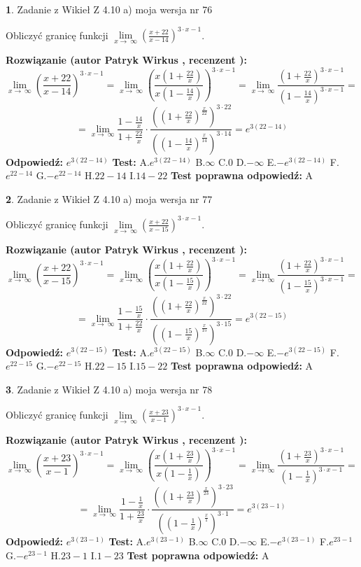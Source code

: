 \documentclass[12pt, a4paper]{article}
\theoremstyle{definition} %
\newtheorem{zad}{}
\newcommand{\zadStart}[1]{\begin{zad}#1\newline}
\newcommand{\zadStop}{\end{zad}}
\newcommand{\rozwStart}[2]{\noindent \textbf{Rozwiązanie (autor #1 , recenzent #2): }\newline}
\newcommand{\rozwStop}{\newline}
\newcommand{\odpStart}{\noindent \textbf{Odpowiedź:}\newline}
\newcommand{\odpStop}{\newline}
\newcommand{\testStart}{\noindent \textbf{Test:}\newline}
\newcommand{\testStop}{\newline}
\newcommand{\kluczStart}{\noindent \textbf{Test poprawna odpowiedź:}\newline}
\newcommand{\kluczStop}{\newline}
\begin{document}
\zadStart{Zadanie z Wikieł Z 4.10 a) moja wersja nr 76}


Obliczyć granicę funkcji  $\lim\limits_{x\to\ \infty}(\frac{x+22}{x-14})^{3\cdot x-1}$.
\zadStop
\rozwStart{Patryk Wirkus}{}
$$\lim\limits_{x\to\ \infty}(\frac{x+22}{x-14})^{3\cdot x-1} = \lim\limits_{x\to\ \infty}(\frac{x(1+\frac{22}{x})}{x(1-\frac{14}{x})})^{3\cdot x-1}=\lim\limits_{x\to\ \infty}\frac{(1+\frac{22}{x})^{3\cdot x-1}}{(1-\frac{14}{x})^{3\cdot x-1}}=$$
$$=\lim\limits_{x\to\ \infty}\frac{1-\frac{14}{x}}{1+\frac{22}{x}}\cdot\frac{((1+\frac{22}{x})^{\frac{x}{22}})^{3\cdot22}}{((1-\frac{14}{x})^{\frac{x}{14}})^{3\cdot14}}=e^{3(22-14)}$$
\rozwStop
\odpStart
$e^{3(22-14)}$
\odpStop
\testStart
A.$e^{3(22-14)}$ B.$\infty$ C.$0$ D.$-\infty$ E.$-e^{3(22-14)}$
F.$e^{22-14}$ G.$-e^{22-14}$
H.$22-14$
I.$14-22$
\testStop
\kluczStart
A
\kluczStop



\zadStart{Zadanie z Wikieł Z 4.10 a) moja wersja nr 77}


Obliczyć granicę funkcji  $\lim\limits_{x\to\ \infty}(\frac{x+22}{x-15})^{3\cdot x-1}$.
\zadStop
\rozwStart{Patryk Wirkus}{}
$$\lim\limits_{x\to\ \infty}(\frac{x+22}{x-15})^{3\cdot x-1} = \lim\limits_{x\to\ \infty}(\frac{x(1+\frac{22}{x})}{x(1-\frac{15}{x})})^{3\cdot x-1}=\lim\limits_{x\to\ \infty}\frac{(1+\frac{22}{x})^{3\cdot x-1}}{(1-\frac{15}{x})^{3\cdot x-1}}=$$
$$=\lim\limits_{x\to\ \infty}\frac{1-\frac{15}{x}}{1+\frac{22}{x}}\cdot\frac{((1+\frac{22}{x})^{\frac{x}{22}})^{3\cdot22}}{((1-\frac{15}{x})^{\frac{x}{15}})^{3\cdot15}}=e^{3(22-15)}$$
\rozwStop
\odpStart
$e^{3(22-15)}$
\odpStop
\testStart
A.$e^{3(22-15)}$ B.$\infty$ C.$0$ D.$-\infty$ E.$-e^{3(22-15)}$
F.$e^{22-15}$ G.$-e^{22-15}$
H.$22-15$
I.$15-22$
\testStop
\kluczStart
A
\kluczStop



\zadStart{Zadanie z Wikieł Z 4.10 a) moja wersja nr 78}


Obliczyć granicę funkcji  $\lim\limits_{x\to\ \infty}(\frac{x+23}{x-1})^{3\cdot x-1}$.
\zadStop
\rozwStart{Patryk Wirkus}{}
$$\lim\limits_{x\to\ \infty}(\frac{x+23}{x-1})^{3\cdot x-1} = \lim\limits_{x\to\ \infty}(\frac{x(1+\frac{23}{x})}{x(1-\frac{1}{x})})^{3\cdot x-1}=\lim\limits_{x\to\ \infty}\frac{(1+\frac{23}{x})^{3\cdot x-1}}{(1-\frac{1}{x})^{3\cdot x-1}}=$$
$$=\lim\limits_{x\to\ \infty}\frac{1-\frac{1}{x}}{1+\frac{23}{x}}\cdot\frac{((1+\frac{23}{x})^{\frac{x}{23}})^{3\cdot23}}{((1-\frac{1}{x})^{\frac{x}{1}})^{3\cdot1}}=e^{3(23-1)}$$
\rozwStop
\odpStart
$e^{3(23-1)}$
\odpStop
\testStart
A.$e^{3(23-1)}$ B.$\infty$ C.$0$ D.$-\infty$ E.$-e^{3(23-1)}$
F.$e^{23-1}$ G.$-e^{23-1}$
H.$23-1$
I.$1-23$
\testStop
\kluczStart
A
\kluczStop
\end{document}
